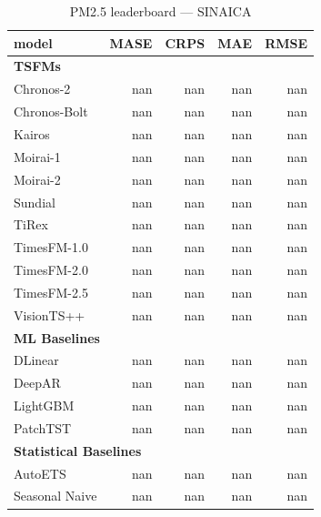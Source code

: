 \begin{table}[H]
\caption{PM2.5 leaderboard --- SINAICA}
\centering
\begin{small}
\begin{tabular}{lrrrr}
\toprule
model & MASE & CRPS & MAE & RMSE \\
\midrule
\multicolumn{5}{l}{\textbf{TSFMs}} \\
Chronos-2 & nan & nan & nan & nan \\
Chronos-Bolt & nan & nan & nan & nan \\
Kairos & nan & nan & nan & nan \\
Moirai-1 & nan & nan & nan & nan \\
Moirai-2 & nan & nan & nan & nan \\
Sundial & nan & nan & nan & nan \\
TiRex & nan & nan & nan & nan \\
TimesFM-1.0 & nan & nan & nan & nan \\
TimesFM-2.0 & nan & nan & nan & nan \\
TimesFM-2.5 & nan & nan & nan & nan \\
VisionTS++ & nan & nan & nan & nan \\
\midrule
\multicolumn{5}{l}{\textbf{ML Baselines}} \\
DLinear & nan & nan & nan & nan \\
DeepAR & nan & nan & nan & nan \\
LightGBM & nan & nan & nan & nan \\
PatchTST & nan & nan & nan & nan \\
\midrule
\multicolumn{5}{l}{\textbf{Statistical Baselines}} \\
AutoETS & nan & nan & nan & nan \\
Seasonal Naive & nan & nan & nan & nan \\
\bottomrule
\end{tabular}
\end{small}
\end{table}